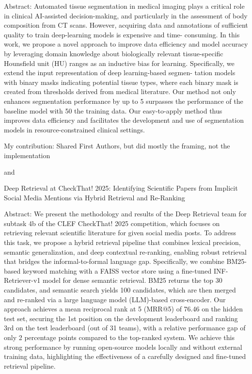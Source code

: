 Abstract: Automated tissue segmentation in medical imaging
plays a critical role in clinical AI-assisted decision-making, and
particularly in the assessment of body composition from CT
scans. However, acquiring data and annotations of sufficient
quality to train deep-learning models is expensive and time-
consuming. In this work, we propose a novel approach to
improve data efficiency and model accuracy by leveraging domain
knowledge about biologically relevant tissue-specific Hounsfield
unit (HU) ranges as an inductive bias for learning. Specifically, we
extend the input representation of deep learning-based segmen-
tation models with binary masks indicating potential tissue types,
where each binary mask is created from thresholds derived from
medical literature. Our method not only enhances segmentation
performance by up to 5 %
surpasses the performance of the baseline model with 50 %
the training data. Our easy-to-apply method thus improves data
efficiency and facilitates the development and use of segmentation
models in resource-constrained clinical settings.


My contribution: Shared First Authors, but did mostly the framing, not the implementation

and

Deep Retrieval at CheckThat! 2025: Identifying Scientific Papers from Implicit Social Media Mentions via Hybrid Retrieval and Re-Ranking

Abstract: We present the methodology and results of the Deep Retrieval team for subtask 4b of the CLEF CheckThat! 2025
competition, which focuses on retrieving relevant scientific literature for given social media posts. To address this
task, we propose a hybrid retrieval pipeline that combines lexical precision, semantic generalization, and deep
contextual re-ranking, enabling robust retrieval that bridges the informal-to-formal language gap. Specifically,
we combine BM25-based keyword matching with a FAISS vector store using a fine-tuned INF-Retriever-v1 model
for dense semantic retrieval. BM25 returns the top 30 candidates, and semantic search yields 100 candidates,
which are then merged and re-ranked via a large language model (LLM)-based cross-encoder.
Our approach achieves a mean reciprocal rank at 5 (MRR@5) of 76.46%
on the hidden test set, securing the 1st position on the development leaderboard and ranking 3rd on the test
leaderboard (out of 31 teams), with a relative performance gap of only 2 percentage points compared to the
top-ranked system. We achieve this strong performance by running open-source models locally and without
external training data, highlighting the effectiveness of a carefully designed and fine-tuned retrieval pipeline.

